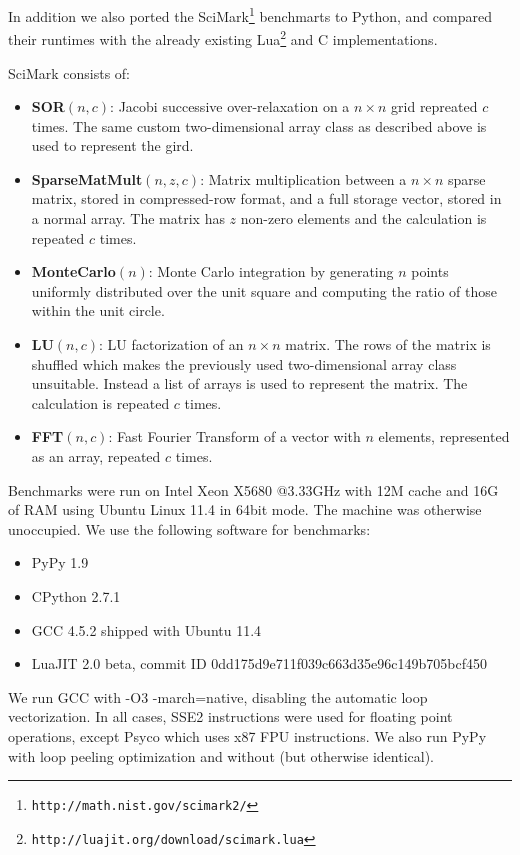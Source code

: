 \documentclass[preprint]{sigplanconf}
\begin{document}
In addition we also ported the 
SciMark\footnote{\texttt{http://math.nist.gov/scimark2/}} benchmarts to Python, and compared
their runtimes with the already existing
Lua\footnote{\texttt{http://luajit.org/download/scimark.lua}} and C
implementations.

SciMark consists of:

\begin{itemize}
\item {\bf SOR}$\left(n, c\right)$: Jacobi successive over-relaxation on a $n\times n$ grid repreated $c$ times.
The same custom two-dimensional array class as described above is used to represent
the gird.
\item {\bf SparseMatMult}$\left(n, z, c\right)$: Matrix multiplication between a $n\times n$ sparse matrix,
stored in compressed-row format, and a full storage vector, stored in a normal array. The matrix has $z$ non-zero elements and the calculation is repeated $c$ times.
\item {\bf MonteCarlo}$\left(n\right)$: Monte Carlo integration by generating $n$ points uniformly distributed over the unit square and computing the ratio of those within the unit circle.
\item {\bf LU}$\left(n, c\right)$: LU factorization of an $n \times n$ matrix. The rows of the matrix is shuffled which makes the previously used two-dimensional array class unsuitable. Instead a list of arrays is used to represent the matrix. The calculation is repeated $c$ times.
\item {\bf FFT}$\left(n, c\right)$: Fast Fourier Transform of a vector with $n$ elements, represented as an array, repeated $c$ times.
\end{itemize}

Benchmarks were run on Intel Xeon X5680 @3.33GHz with 12M cache and 16G of RAM
using Ubuntu Linux 11.4 in 64bit mode.
The machine was otherwise unoccupied. We use the following software
for benchmarks:

\begin{itemize}
\item PyPy 1.9
\item CPython 2.7.1
\item GCC 4.5.2 shipped with Ubuntu 11.4
\item LuaJIT 2.0 beta, commit ID 0dd175d9e711f039c663d35e96c149b705bcf450
\end{itemize}

We run GCC with -O3 -march=native, disabling the
automatic loop vectorization. In all cases, SSE2 instructions were used for
floating point operations, except Psyco which uses x87 FPU instructions.
We also run PyPy with loop peeling optimization and without (but otherwise
identical).
\end{document}
